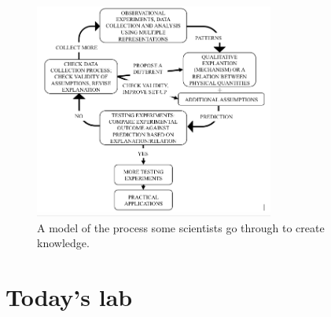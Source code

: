 \begin{figure}
	\centering
	\includegraphics[width=0.7\textwidth]{measurement/islegraphic.png}
	\caption{A model of the process some scientists go through to create knowledge.\cite{etkina_millikan_2015}}\label{me:fig:isle}
\end{figure}

 



\section*{Today's lab}

